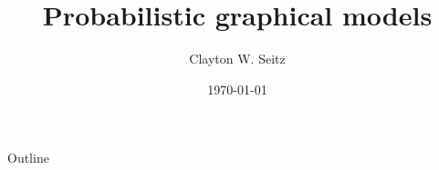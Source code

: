 \documentclass[aspectratio=1610]{beamer}					%
\title{Probabilistic graphical models}	%
\author{Clayton W. Seitz}								%
\date{\today}									%
\begin{document}
\begin{frame}
  \titlepage
\end{frame}

\begin{frame}{Outline}
  \tableofcontents
\end{frame}

%
\end{document}
